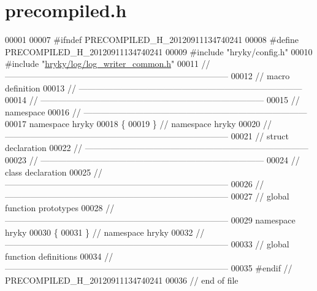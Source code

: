 \hypertarget{log_2src_2precompiled_8h_source}{\section{precompiled.\-h}
}

\begin{DoxyCode}
00001 
00007 \textcolor{preprocessor}{#ifndef PRECOMPILED\_H\_20120911134740241}
00008 \textcolor{preprocessor}{}\textcolor{preprocessor}{#define PRECOMPILED\_H\_20120911134740241}
00009 \textcolor{preprocessor}{}\textcolor{preprocessor}{#include "hryky/config.h"}
00010 \textcolor{preprocessor}{#include "\hyperlink{log__writer__common_8h}{hryky/log/log_writer_common.h}"}
00011 \textcolor{comment}{//
      ------------------------------------------------------------------------------}
00012 \textcolor{comment}{// macro definition}
00013 \textcolor{comment}{//
      ------------------------------------------------------------------------------}
00014 \textcolor{comment}{//
      ------------------------------------------------------------------------------}
00015 \textcolor{comment}{// namespace}
00016 \textcolor{comment}{//
      ------------------------------------------------------------------------------}
00017 \textcolor{keyword}{namespace }hryky
00018 \{
00019 \} \textcolor{comment}{// namespace hryky}
00020 \textcolor{comment}{//
      ------------------------------------------------------------------------------}
00021 \textcolor{comment}{// struct declaration}
00022 \textcolor{comment}{//
      ------------------------------------------------------------------------------}
00023 \textcolor{comment}{//
      ------------------------------------------------------------------------------}
00024 \textcolor{comment}{// class declaration}
00025 \textcolor{comment}{//
      ------------------------------------------------------------------------------}
00026 \textcolor{comment}{//
      ------------------------------------------------------------------------------}
00027 \textcolor{comment}{// global function prototypes}
00028 \textcolor{comment}{//
      ------------------------------------------------------------------------------}
00029 \textcolor{keyword}{namespace }hryky
00030 \{
00031 \} \textcolor{comment}{// namespace hryky}
00032 \textcolor{comment}{//
      ------------------------------------------------------------------------------}
00033 \textcolor{comment}{// global function definitions}
00034 \textcolor{comment}{//
      ------------------------------------------------------------------------------}
00035 \textcolor{preprocessor}{#endif // PRECOMPILED\_H\_20120911134740241}
00036 \textcolor{preprocessor}{}\textcolor{comment}{// end of file}
\end{DoxyCode}
